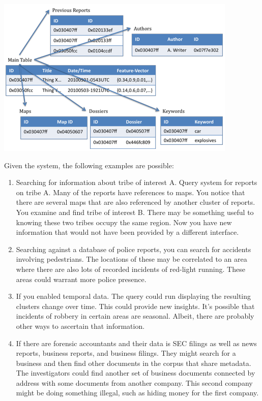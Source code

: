 \documentclass[11pt]{article}
\begin{document}
\begin{center}
\includegraphics[keepaspectratio=true,scale=0.75]{tableview.png}
\end{center}

Given the system, the following examples are possible:
\begin{enumerate}
\item Searching for information about tribe of interest A.  Query system for reports on tribe A.  Many of the reports have references to maps.  You notice that there are several maps that are also referenced by another cluster of reports.  You examine and find tribe of interest B.  There may be something useful to knowing these two tribes occupy the same region.  Now you have new information that would not have been provided by a different interface.
\item Searching against a database of police reports, you can search for accidents involving pedestrians.  The locations of these may be correlated to an area where there are also lots of recorded incidents of red-light running.  These areas could warrant more police presence.
\item If you enabled temporal data.  The query could run displaying the resulting clusters change over time.  This could provide new insights.  It’s possible that incidents of robbery in certain areas are seasonal.  Albeit, there are probably other ways to ascertain that information.
\item If there are forensic accountants and their data is SEC filings as well as news reports, business reports, and business filings.  They might search for a business and then find other documents in the corpus that share metadata.  The investigators could find another set of business documents connected by address with some documents from another company.  This second company might be doing something illegal, such as hiding money for the first company.
\end{enumerate}
\end{document}
